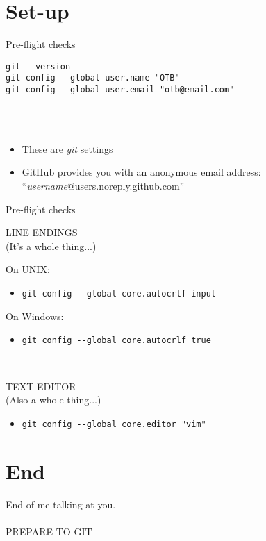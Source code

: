 \documentclass[presentation]{beamer}
\begin{document}
\section{Set-up}
\begin{frame}[fragile]{Pre-flight checks}
\begin{lstlisting}
git --version
git config --global user.name "OTB"
git config --global user.email "otb@email.com"
\end{lstlisting}
\hfill \\
\hfill \\
\begin{itemize}
	\item These are \emph{git} settings
	\item GitHub provides you with an anonymous email address: ``\emph{username}@users.noreply.github.com''
\end{itemize}

\end{frame}

\begin{frame}{Pre-flight checks}
\begin{center}
LINE ENDINGS \\
(It's a whole thing...)
\end{center}

On UNIX:
\begin{itemize}
	\item \lstinline$git config --global core.autocrlf input$
\end{itemize}

On Windows:
\begin{itemize}
	\item \lstinline$git config --global core.autocrlf true$
\end{itemize}
\hfill \\
\begin{center}
TEXT EDITOR \\
(Also a whole thing...)
\end{center}

\begin{itemize}
	\item \lstinline$git config --global core.editor "vim"$
\end{itemize}

\end{frame}

\section{End}
\begin{frame}
	\centering
	End of me talking at you. \\
	\hfill \\
	PREPARE TO GIT	
\end{frame}
\end{document}
